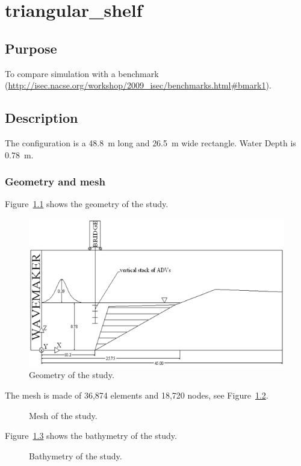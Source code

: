 \chapter{triangular\_shelf}

\section{Purpose}

To compare  simulation with a benchmark
(\url{http://isec.nacse.org/workshop/2009_isec/benchmarks.html#bmark1}).

\section{Description}

The configuration is a 48.8~m long and 26.5~m wide rectangle.
Water Depth is 0.78~m.

\subsection{Geometry and mesh}

Figure~\ref{fig:triang:geometry} shows the geometry of the study.

\begin{figure}[H]
\centering
\includegraphics[width=.6\textwidth]{img/geom.png}
\caption{Geometry of the study.}
\label{fig:triang:geometry}
\end{figure}

The mesh is made of 36,874 elements and 18,720 nodes,
see Figure~\ref{fig:triang:mesh}.

\begin{figure}[H]
\centering
{}
\caption{Mesh of the study.}
\label{fig:triang:mesh}
\end{figure}

Figure~\ref{fig:triang:bathy} shows the bathymetry of the study.

\begin{figure}[H]
\centering
{}
\caption{Bathymetry of the study.}
\label{fig:triang:bathy}
\end{figure}

